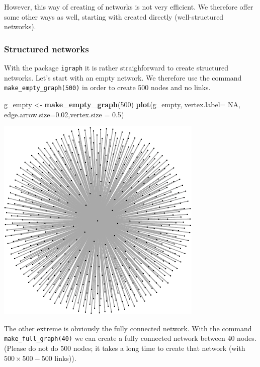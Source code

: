 \documentclass[]{article}
\newenvironment{Shaded}{\begin{snugshade}}{\end{snugshade}}
\newcommand{\KeywordTok}[1]{\textcolor[rgb]{0.13,0.29,0.53}{\textbf{{#1}}}}
\newcommand{\DataTypeTok}[1]{\textcolor[rgb]{0.13,0.29,0.53}{{#1}}}
\newcommand{\DecValTok}[1]{\textcolor[rgb]{0.00,0.00,0.81}{{#1}}}
\newcommand{\FloatTok}[1]{\textcolor[rgb]{0.00,0.00,0.81}{{#1}}}
\newcommand{\StringTok}[1]{\textcolor[rgb]{0.31,0.60,0.02}{{#1}}}
\newcommand{\OtherTok}[1]{\textcolor[rgb]{0.56,0.35,0.01}{{#1}}}
\newcommand{\NormalTok}[1]{{#1}}
\theoremstyle{definition}
\theoremstyle{definition}
\theoremstyle{definition}
\theoremstyle{remark}
\begin{document}
However, this way of creating of networks is not very efficient. We
therefore offer some other ways as well, starting with created directly
(well-structured networks).

\subsubsection{Structured networks}\label{structured-networks}

With the package \texttt{igraph} it is rather straighforward to create
structured networks. Let's start with an empty network. We therefore use
the command \texttt{make\_empty\_graph(500)} in order to create 500
nodes and no links.

\begin{Shaded}
\begin{Highlighting}[]
\NormalTok{g_empty <-}\StringTok{ }\KeywordTok{make_empty_graph}\NormalTok{(}\DecValTok{500}\NormalTok{)}
\KeywordTok{plot}\NormalTok{(g_empty, }\DataTypeTok{vertex.label=} \OtherTok{NA}\NormalTok{, }\DataTypeTok{edge.arrow.size=}\FloatTok{0.02}\NormalTok{,}\DataTypeTok{vertex.size =} \FloatTok{0.5}\NormalTok{)}
\end{Highlighting}
\end{Shaded}

\includegraphics{ResearchTools_files/figure-latex/unnamed-chunk-51-1.pdf}

The other extreme is obviously the fully connected network. With the
command \texttt{make\_full\_graph(40)} we can create a fully connected
network between 40 nodes. (Please do not do 500 nodes; it takes a long
time to create that network (with \(500 \times 500 - 500\) links)).
\end{document}
